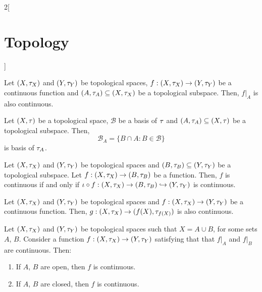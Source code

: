 \documentclass[../../../main_math.tex]{subfiles}
\begin{document}
\begin{multicols}{2}[\section{Topology}]
\begin{proposition}
  \end{proposition}
  \begin{corollary}
    Let $(X,\tau_X)$ and $(Y,\tau_Y)$ be topological spaces, $f:(X,\tau_X)\rightarrow (Y,\tau_Y)$ be a continuous function and $(A,\tau_A)\subseteq (X,\tau_X)$ be a topological subspace. Then, $f|_A$ is also continuous.
  \end{corollary}
  \begin{proposition}
    Let $(X,\tau)$ be a topological space, $\mathcal{B}$ be a basis of $\tau$ and $(A,\tau_A)\subseteq (X,\tau)$ be a topological subspace. Then, $$\mathcal{B}_A=\{B\cap A:B\in\mathcal{B}\}$$ is basis of $\tau_A$.
  \end{proposition}
  \begin{proposition}
    Let $(X,\tau_X)$ and $(Y,\tau_Y)$ be topological spaces and $(B,\tau_B)\subseteq (Y,\tau_Y)$ be a topological subspace. Let $f:(X,\tau_X)\rightarrow (B,\tau_B)$ be a function. Then, $f$ is continuous if and only if $\iota\circ f:(X,\tau_X)\rightarrow (B,\tau_B)\hookrightarrow (Y,\tau_Y)$ is continuous.
  \end{proposition}
  \begin{corollary}
    Let $(X,\tau_X)$ and $(Y,\tau_Y)$ be topological spaces and $f:(X,\tau_X)\rightarrow (Y,\tau_Y)$ be a continuous function. Then, $g:(X,\tau_X)\rightarrow (f(X),\tau_{f(X)})$ is also continuous.
  \end{corollary}
  \begin{proposition}
    Let $(X,\tau_X)$ and $(Y,\tau_Y)$ be topological spaces such that $X=A\cup B$, for some sets $A$, $B$. Consider a function $f:(X,\tau_X)\rightarrow (Y,\tau_Y)$ satisfying that that $f|_A$ and $f|_B$ are continuous. Then:
    \begin{enumerate}
      \item If $A$, $B$ are open, then $f$ is continuous.
      \item If $A$, $B$ are closed, then $f$ is continuous.
    \end{enumerate}
  \end{proposition}

\end{multicols}
\end{document}
